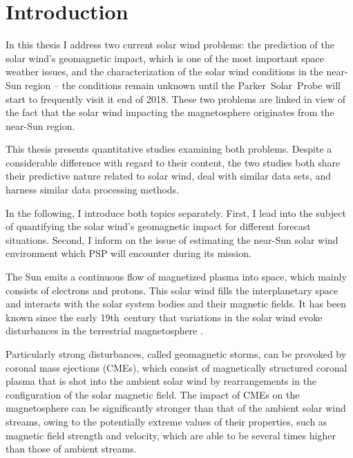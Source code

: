 
\chapter{Introduction}
\label{chap:introduction}

In this thesis I address two current solar wind problems: the prediction of the solar wind's geomagnetic impact, which is one of the most important space weather issues, and the characterization of the solar wind conditions in the near-Sun region -- the conditions remain unknown until the Parker~Solar~Probe will start to frequently visit it end of 2018. These two problems are linked in view of the fact that the solar wind impacting the magnetosphere originates from the near-Sun region.

This thesis presents quantitative studies examining both problems. Despite a considerable difference with regard to their content, the two studies both share their predictive nature related to solar wind, deal with similar data sets, and harness similar data processing methods.

In the following, I introduce both topics separately. First, I lead into the subject of quantifying the solar wind's geomagnetic impact for different forecast situations. Second, I inform on the issue of estimating the near-Sun solar wind environment which PSP will encounter during its mission.

\bigskip


The Sun emits a continuous flow of magnetized plasma into space, which mainly consists of electrons and protons. This solar wind fills the interplanetary space and interacts with the solar system bodies and their magnetic fields. It has been known since the early 19th~century that variations in the solar wind evoke disturbances in the terrestrial magnetosphere \citep{Bartels1962}.

Particularly strong disturbances, called geomagnetic storms, can be provoked by coronal mass ejections (CMEs), which consist of magnetically structured coronal plasma that is shot into the ambient solar wind by rearrangements in the configuration of the solar magnetic field. The impact of CMEs on the magnetosphere can be significantly stronger than that of the ambient solar wind streams, owing to the potentially extreme values of their properties, such as magnetic field strength and velocity, which are able to be several times higher than those of ambient streams.

